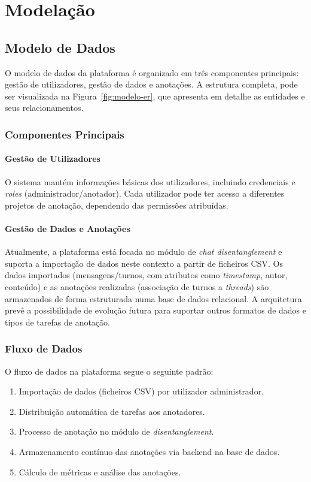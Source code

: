 \section{Modelação}

\subsection{Modelo de Dados}

O modelo de dados da plataforma é organizado em três componentes principais: gestão de utilizadores, gestão de dados e anotações. A estrutura completa, pode ser visualizada na Figura~\ref{fig:modelo-er}, que apresenta em detalhe as entidades e seus relacionamentos.

\subsubsection{Componentes Principais}

\paragraph{Gestão de Utilizadores}
O sistema mantém informações básicas dos utilizadores, incluindo credenciais e \textit{roles} (administrador/anotador). Cada utilizador pode ter acesso a diferentes projetos de anotação, dependendo das permissões atribuídas.

\paragraph{Gestão de Dados e Anotações}
Atualmente, a plataforma está focada no módulo de \textit{chat disentanglement} e suporta a importação de dados neste contexto a partir de ficheiros CSV. Os dados importados (mensagens/turnos, com atributos como \textit{timestamp}, autor, conteúdo) e as anotações realizadas (associação de turnos a \textit{threads}) são armazenados de forma estruturada numa base de dados relacional. A arquitetura prevê a possibilidade de evolução futura para suportar outros formatos de dados e tipos de tarefas de anotação.

\subsubsection{Fluxo de Dados}

O fluxo de dados na plataforma segue o seguinte padrão:
\begin{enumerate}
    \item Importação de dados (ficheiros CSV) por utilizador administrador.
    \item Distribuição automática de tarefas aos anotadores.
    \item Processo de anotação no módulo de \textit{disentanglement}.
    \item Armazenamento contínuo das anotações via backend na base de dados.
    \item Cálculo de métricas e análise das anotações.
\end{enumerate}

